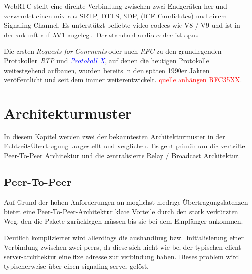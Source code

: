 \documentclass{article}
\begin{document}
\begin{onecolumn}
WebRTC stellt eine direkte Verbindung zwischen zwei Endgeräten her und
verwendet einen mix aus SRTP, DTLS, SDP, (ICE Candidates) und einem
Signaling-Channel. Es unterstützt beliebte video codecs wie V8 / V9 und ist in
der zukunft auf AV1 angelegt. Der standard audio codec ist opus.





Die ersten \textit{Requests for Comments} oder auch \textit{RFC} zu
den grundlegenden Protokollen \textit{RTP} und
\textit{\textcolor{blue}{Protokoll X}}, auf denen die heutigen Protokolle
weitestgehend aufbauen, wurden bereits in den späten 1990er Jahren
veröffentlicht und seit dem immer weiterentwickelt. \textcolor{red}{quelle
anhängen RFC35XX}.

\section{Architekturmuster}

In diesem Kapitel werden zwei der bekanntesten Architekturmuster in der
Echtzeit-Übertragung vorgestellt und verglichen. Es geht primär um die
verteilte Peer-To-Peer Architektur und die zentralisierte Relay / Broadcast
Architektur.

\subsection{Peer-To-Peer}

Auf Grund der hohen Anforderungen an möglichst niedrige Übertragungslatenzen
bietet eine Peer-To-Peer-Architektur klare Vorteile durch den stark verkürzten
Weg, den die Pakete zurücklegen müssen bis sie bei dem Empfänger ankommen.

Deutlich komplizierter wird allerdings die aushandlung bzw.\ initialisierung
einer Verbindung zwischen zwei peers, da diese sich nicht wie bei der typischen
client-server-architektur eine fixe adresse zur verbindung haben. Dieses
problem wird typischerweise über einen signaling server gelöst.


\end{onecolumn}
\end{document}
